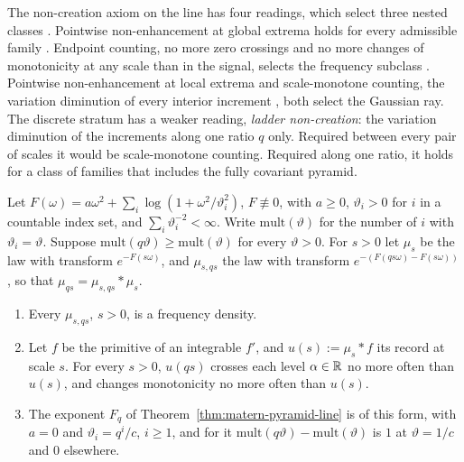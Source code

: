 The non-creation axiom on the line has four readings, which select three nested classes
. Pointwise non-enhancement at global extrema holds for every
admissible family . Endpoint counting, no more zero
crossings and no more changes of monotonicity at any scale than in the signal, selects the \Polya{}
frequency subclass . Pointwise non-enhancement at local
extrema  and scale-monotone counting, the variation
diminution of every interior increment , both select the
Gaussian ray. The discrete stratum has a weaker reading, \emph{ladder non-creation}: the variation
diminution of the increments along one ratio $q$ only. Required between every pair of scales it would
be scale-monotone counting. Required along one ratio, it holds for a class of families that includes
the fully covariant \Matern{} pyramid.

\begin{proposition}
\label{prop:ladder-non-creation-line}

Let $F(\omega) = a\omega^2 + \sum_i\log(1 + \omega^2/\vartheta_i^2)$, $F \not\equiv 0$, with
$a \ge 0$, $\vartheta_i > 0$ for $i$ in a countable index set, and $\sum_i\vartheta_i^{-2} < \infty$.
Write $\mathrm{mult}(\vartheta)$ for the number of $i$ with $\vartheta_i = \vartheta$. Suppose
$\mathrm{mult}(q\vartheta) \ge \mathrm{mult}(\vartheta)$ for every $\vartheta > 0$. For $s > 0$ let
$\mu_s$ be the law with transform $e^{-F(s\omega)}$, and $\mu_{s,qs}$ the law with transform
$e^{-(F(qs\omega) - F(s\omega))}$, so that $\mu_{qs} = \mu_{s,qs} * \mu_s$.
\begin{enumerate}
\item Every $\mu_{s,qs}$, $s > 0$, is a \Polya{} frequency density.
\item Let $f$ be the primitive of an integrable $f'$, and $u(s) := \mu_s * f$ its record at scale
$s$. For every $s > 0$, $u(qs)$ crosses each level $\alpha \in \mathbb{R}$ no more often than $u(s)$, and
changes monotonicity no more often than $u(s)$.
\item The exponent $F_q$ of Theorem~\ref{thm:matern-pyramid-line} is of this form, with $a = 0$ and
$\vartheta_i = q^i/c$, $i \ge 1$, and for it $\mathrm{mult}(q\vartheta) - \mathrm{mult}(\vartheta)$
is $1$ at $\vartheta = 1/c$ and $0$ elsewhere.
\end{enumerate}
\end{proposition}

